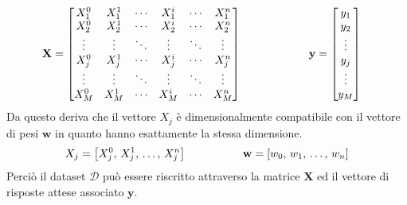 \begin{gather*}
    \begin{aligned}
        \mathbf{X} &= 
            \begin{bmatrix}
            X_1^0       & X_1^1         & \cdots     & X_1^i         & \cdots     & X_1^n     \\
            X_2^0       & X_2^1         & \cdots     & X_2^i         & \cdots     & X_2^n     \\
            \vdots      & \vdots        & \ddots     & \vdots        & \ddots     & \vdots    \\
            X_j^0       & X_j^1         & \cdots     & X_j^i         & \cdots     & X_j^n     \\
            \vdots      & \vdots        & \ddots     & \vdots        & \ddots     & \vdots    \\
            X_M^0       & X_M^1         & \cdots     & X_M^i         & \cdots     & X_M^n     \\
            \end{bmatrix}
        \hspace{60px}
        \mathbf{y} = 
            \begin{bmatrix}
            y_1 \\ y_2 \\ \vdots \\ y_j \\ \vdots \\ y_M
            \end{bmatrix}
    \end{aligned}
\end{gather*}
% 
\noindent Da questo deriva che il vettore $X_j$ è dimensionalmente compatibile con il vettore di pesi $\mathbf{w}$ in quanto hanno esattamente la stessa dimensione.
% 
\begin{gather*}
    \begin{aligned}
        X_j = \left[ X_j^0,\, X_j^1,\,\dots,\, X_j^n \right]
        \hspace{50px}
        \mathbf{w} = \left[w_0,\, w_1,\, \dots,\, w_n \right]
    \end{aligned}
\end{gather*}
% 
\noindent Perciò il dataset $\mathcal{D}$ può essere riscritto attraverso la matrice $\mathbf{X}$ ed il vettore di risposte attese associato $\mathbf{y}$.
